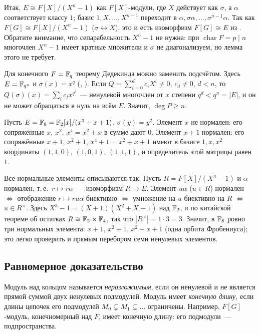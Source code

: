 Итак, $E\cong F[X]/(X^n-1)$ как $F[X]$-модули, где $X$ действует как $\sigma$, а $\alpha$ соответствует классу $1$; базис
$1,X,\dots,X^{n-1}$ переходит в $\alpha,\sigma\alpha,\dots,\sigma^{n-1}\alpha$. Так как $F[G]\cong F[X]/(X^n-1)$
($\sigma\leftrightarrow X$), это и есть изоморфизм $F[G]\cong E$ из . Обратите внимание, что сепарабельность
$X^n-1$ не нужна: при $\operatorname{char}F=p\mid n$ многочлен $X^n-1$ имеет кратные множители и $\sigma$ не
диагонализуем, но лемма  этого не требует.

\begin{remark}[5.19d]
Для конечного $F=\mathbb F_q$ теорему Дедекинда можно заменить подсчётом. Здесь $E=\mathbb F_{q^n}$ и $\sigma(x)=x^q$
(, ). Если $Q=\sum_{i=0}^dc_iX^i\ne0$, $c_d\ne0$, $d<n$, то $Q(\sigma)(x)=\sum_ic_ix^{q^i}$~--- ненулевой
многочлен от $x$ степени $q^d<q^n=|E|$, и он не может обращаться в нуль на всём $E$. Значит, $\deg P\ge n$.
\end{remark}

\begin{example}[5.19e]
Пусть $E=\mathbb F_8=\mathbb F_2[x]/(x^3+x+1)$, $\sigma(y)=y^2$. Элемент $x$ не нормален: его сопряжённые $x$, $x^2$, $x^4=x^2+x$ в
сумме дают $0$. Элемент $x+1$ нормален: его сопряжённые $x+1$, $x^2+1$, $x^4+1=x^2+x+1$ имеют в базисе $1,x,x^2$
координаты $(1,1,0)$, $(1,0,1)$, $(1,1,1)$, и определитель этой матрицы равен $1$.

Все нормальные элементы описываются так. Пусть $R=F[X]/(X^n-1)$ и $\alpha$ нормален, т.\,е.\ $r\mapsto r\alpha$~---
изоморфизм $R\to E$. Элемент $u\alpha$ ($u\in R$) нормален $\iff$ отображение $r\mapsto ru\alpha$ биективно $\iff$
умножение на $u$ биективно на $R$ $\iff$ $u\in R^\times$. Здесь $X^3-1=(X+1)(X^2+X+1)$ над $\mathbb F_2$, и по китайской
теореме об остатках $R\cong\mathbb F_2\times\mathbb F_4$, так что $|R^\times|=1\cdot3=3$. Значит, в $\mathbb F_8$ ровно три нормальных
элемента: $x+1$, $x^2+1$, $x^2+x+1$ (одна орбита Фробениуса); это легко проверить и прямым перебором семи ненулевых
элементов.
\end{example}

\subsection*{Равномерное доказательство}

Модуль над кольцом называется \emph{неразложимым}, если он ненулевой и не является прямой суммой двух ненулевых
подмодулей. Модуль имеет \emph{конечную длину}, если длины цепочек его подмодулей $M_0\subsetneq M_1\subsetneq\dots$
ограничены. Например, $F[G]$-модуль, конечномерный над $F$, имеет конечную длину: его подмодули~--- подпространства.

